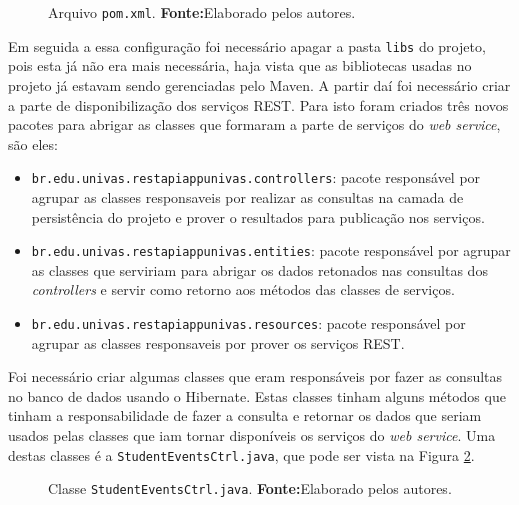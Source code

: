 	\begin{figure}[h!]
		
		\caption[Arquivo pom.xml]{Arquivo \texttt{pom.xml}.
		\textbf{Fonte:}Elaborado pelos autores.}
		\label{fig:desws18}
	\end{figure}

	\par Em seguida a essa configuração foi necessário apagar a pasta \texttt{libs}
do projeto, pois esta já não era mais necessária, haja vista que as bibliotecas
usadas no projeto já estavam sendo gerenciadas pelo Maven. A partir daí foi
necessário criar a parte de disponibilização dos serviços REST. Para isto foram
criados três novos pacotes para abrigar as classes que formaram a parte de
serviços do \textit{web service}, são eles:
	
	\begin{itemize}
	  \item \texttt{br.edu.univas.restapiappunivas.controllers}: pacote responsável
	  por agrupar as classes responsaveis por realizar as consultas na camada de
	  persistência do projeto e prover o resultados para publicação nos serviços.
	  \item \texttt{br.edu.univas.restapiappunivas.entities}: pacote responsável
	  por agrupar as classes que serviriam para abrigar os dados retonados nas
	  consultas dos \textit{controllers} e servir como retorno aos métodos das
	  classes de serviços.
	  \item \texttt{br.edu.univas.restapiappunivas.resources}: pacote responsável
	  por agrupar as classes responsaveis por prover os serviços REST.
	\end{itemize}


	\par Foi necessário criar algumas classes que eram responsáveis por fazer as
consultas no banco de dados usando o Hibernate. Estas classes tinham alguns
métodos que tinham a responsabilidade de fazer a consulta e retornar os dados
que seriam usados pelas classes que iam tornar disponíveis os serviços do
\textit{web service}. Uma destas classes é a \texttt{StudentEventsCtrl.java},
que pode ser vista na Figura \ref{fig:desws19}.
	
	\begin{figure}[h!]
		
		\caption[Classe StudentEventsCtrl.java]{Classe
		\texttt{StudentEventsCtrl.java}.
		\textbf{Fonte:}Elaborado pelos autores.}
		\label{fig:desws19}
	\end{figure}

	\pagebreak
	
